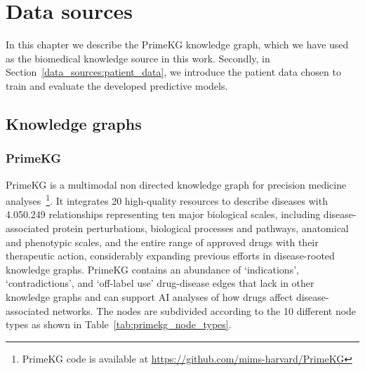 \chapter{Data sources}\label{data_sources}
In this chapter we describe the PrimeKG knowledge graph\cite{ChandakPayal2023Bakg}, which we have used as the biomedical knowledge source in this work. Secondly, in Section~\ref{data_sources:patient_data}, we introduce the patient data chosen to train and evaluate the developed predictive models.

\section{Knowledge graphs}


\subsection{PrimeKG}\label{data_sources:primekg}

PrimeKG is a multimodal non directed knowledge graph for precision medicine analyses~\cite{ChandakPayal2023Bakg}\footnote{PrimeKG code is available at \url{https://github.com/mims-harvard/PrimeKG}}. It integrates 20 high-quality resources to describe  diseases with 4.050.249 relationships representing ten major biological scales, including disease-associated protein perturbations, biological processes and pathways, anatomical and phenotypic scales, and the entire range of approved drugs with their therapeutic action, considerably expanding previous efforts in disease-rooted knowledge graphs. PrimeKG contains an abundance of ‘indications’, ‘contradictions’, and ‘off-label use’ drug-disease edges that lack in other knowledge graphs and can support AI analyses of how drugs affect disease-associated networks. 
The  nodes are subdivided according to the 10 different node types as shown in Table~\ref{tab:primekg_node_types}. 


